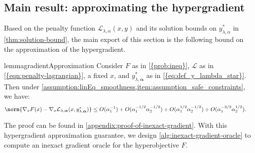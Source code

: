 \subsection{Main result: approximating the hypergradient}
Based on the penalty function $\mathcal{L}_{\lambda,\alpha}(x,y)$ and its solution bounds on $y^*_{\lambda,\alpha}$ in \cref{thm:solution-bound}, the main export of this section is the following bound on the approximation of  the hypergradient. 
\begin{restatable}[]{lemma}{gradientApproximation}\label{thm:diff_in_hypergrad_and_gradLagr}
Consider $F$ as in \cref{{prob:ineq}},   $\mathcal{L}$ as in  \cref{{eqn:penalty-lagrangian}},  a fixed $x$, and $y_{\lambda, \boldsymbol{\alpha}}^*$ as in \cref{{eq:def_y_lambda_star}}. Then under \cref{assumption:linEq_smoothness,item:assumption_safe_constraints}, we have: 
\begin{align*}%
   & \norm{\nabla_x F(x) - \nabla_x \mathcal{L}_{\lambda, \boldsymbol{\alpha}}(x, y_{\lambda, \boldsymbol{\alpha}}^*)} \leq O({\alpha_1^{-1}}) + O({\alpha_1^{-1/2}\alpha_2^{-1/2}}) + O({\alpha_1^{1/2}}{\alpha_2^{-1/2}}) + O({\alpha_1^{-3/2}}{\alpha_2^{1/2}}).
\end{align*}
\end{restatable}
The proof can be found in \cref{appendix:proof-of-inexact-gradient}. %
With this hypergradient approximation guarantee, we design \cref{alg:inexact-gradient-oracle} to compute an inexact gradient oracle for the hyperobjective $F$.
